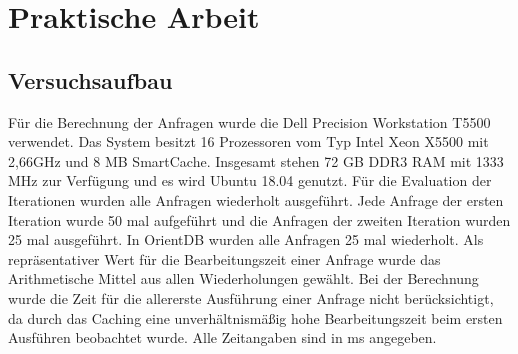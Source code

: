 
\chapter{Praktische Arbeit} %

\label{Kaptiel4} %

\section{Versuchsaufbau}
Für die Berechnung der Anfragen wurde die Dell Precision Workstation T5500 verwendet. Das System besitzt 16 Prozessoren vom Typ Intel Xeon  X5500 mit 2,66GHz und  8 MB SmartCache. Insgesamt stehen 72 GB DDR3 RAM mit 1333 MHz zur Verfügung und es wird Ubuntu 18.04 genutzt. Für die Evaluation der Iterationen wurden alle Anfragen wiederholt ausgeführt. \newline
 Jede Anfrage der ersten Iteration wurde 50 mal aufgeführt und die Anfragen der zweiten Iteration wurden 25 mal ausgeführt. In OrientDB wurden alle Anfragen 25 mal wiederholt. Als repräsentativer Wert für die Bearbeitungszeit einer Anfrage  wurde das Arithmetische Mittel aus allen Wiederholungen gewählt. Bei der Berechnung wurde die Zeit für die allererste Ausführung einer Anfrage nicht berücksichtigt, da durch das Caching eine unverhältnismäßig hohe Bearbeitungszeit beim ersten Ausführen beobachtet wurde. Alle Zeitangaben sind in ms angegeben. 
